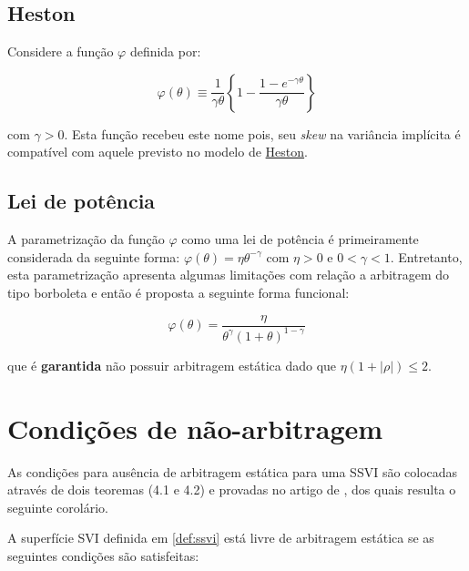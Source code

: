 \documentclass[]{book}
\theoremstyle{definition}
\theoremstyle{definition}
\theoremstyle{definition}
\theoremstyle{remark}
\let\BeginKnitrBlock\begin \let\EndKnitrBlock\end
\begin{document}
\hypertarget{heston-1}{%
\subsection{Heston}\label{heston-1}}

Considere a função \(\varphi\) definida por:

\begin{equation}
\varphi(\theta)\equiv\frac{1}{\gamma\theta}\left\lbrace 1-\frac{1-e^{-\gamma\theta}}{\gamma\theta}\right\rbrace
\label{eq:heston-phi}
\end{equation}

com \(\gamma > 0\). Esta função recebeu este nome pois, seu \emph{skew} na variância implícita é compatível com aquele previsto no modelo de \protect\hyperlink{superficies}{Heston}.

\hypertarget{lei-de-potencia}{%
\subsection{Lei de potência}\label{lei-de-potencia}}

A parametrização da função \(\varphi\) como uma lei de potência é primeiramente considerada da seguinte forma: \(\varphi(\theta)=\eta\theta^{-\gamma}\) com \(\eta > 0\) e \(0<\gamma<1\). Entretanto, esta parametrização apresenta algumas limitações com relação a arbitragem do tipo borboleta e então é proposta a seguinte forma funcional:

\begin{equation}
\varphi(\theta)=\frac{\eta}{\theta^\gamma(1+\theta)^{1-\gamma}}
\label{eq:pl-phi}
\end{equation}

que é \textbf{garantida} não possuir arbitragem estática dado que \(\eta(1+|\rho|)\leq 2\).

\hypertarget{condicoes-de-nao-arbitragem}{%
\section{Condições de não-arbitragem}\label{condicoes-de-nao-arbitragem}}

As condições para ausência de arbitragem estática para uma SSVI são colocadas através de dois teoremas (4.1 e 4.2) e provadas no artigo de \citep{Gatheral2014}, dos quais resulta o seguinte corolário.

\BeginKnitrBlock{corollary}
\protect\hypertarget{cor:ssvi-arbitrage}{}{\label{cor:ssvi-arbitrage} }A superfície SVI definida em \ref{def:ssvi} está livre de arbitragem estática se as seguintes condições são satisfeitas:
\EndKnitrBlock{corollary}
\end{document}
